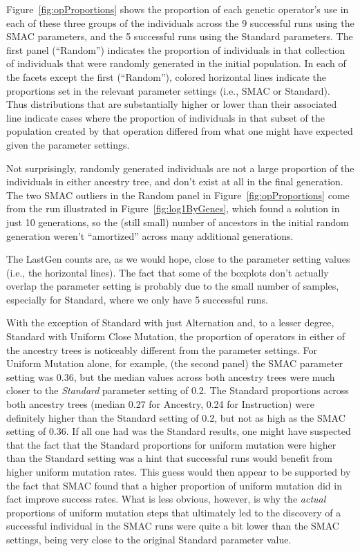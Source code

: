 Figure~\ref{fig:opProportions} shows the proportion of each genetic 
operator's use in each of these three groups of the individuals across
the 9 successful runs using the SMAC parameters, and the 5 successful runs
using the Standard parameters. The first
panel (``Random'') indicates the proportion of individuals in that collection
of individuals that were randomly generated in the initial population. 
In each of
the facets except the first (``Random''), colored horizontal lines indicate
the proportions set in the relevant parameter settings (i.e., SMAC or
Standard). Thus distributions that are substantially higher or lower than
their associated line indicate cases where the proportion of individuals in
that subset of the population created by that operation differed from what
one might have expected given the parameter settings.

Not surprisingly, randomly generated individuals are not a large
proportion of the individuals in either ancestry tree, and don't exist
at all in the final generation. The two SMAC outliers in the Random panel in Figure~\ref{fig:opProportions} come from the run
illustrated in Figure~\ref{fig:log1ByGenes}, which found a solution in 
just 10 generations, so the (still small) number
of ancestors in the initial random generation weren't ``amortized''
across many additional generations.

The LastGen counts are, as we would hope, close to the parameter
setting values (i.e., the horizontal lines). The fact that some of the
boxplots don't actually overlap the parameter setting is probably due
to the small number of samples, especially for Standard, where we only
have 5 successful runs.

With the exception of Standard with just Alternation and, to a
lesser degree, Standard with Uniform Close Mutation, the proportion
of operators in either of the ancestry trees is noticeably
different from the parameter settings. For Uniform Mutation alone, for 
example, (the second panel) the SMAC parameter setting
was 0.36, but the median values across both ancestry trees were much closer to
the \emph{Standard} parameter setting of 0.2. The Standard proportions across
both ancestry trees (median 0.27 for Ancestry, 0.24 for Instruction) were definitely higher than the Standard setting of 0.2, but not as high as the
SMAC setting of 0.36. If all one had was the Standard results, one might 
have suspected that the fact that
the Standard proportions for uniform mutation were higher than the Standard
setting was a hint that successful runs would benefit from higher uniform
mutation rates. This guess would then appear to be supported by the fact
that SMAC found that a higher proportion of uniform mutation did in fact
improve success rates. What is less obvious, however, is why the \emph{actual}
proportions of uniform mutation steps that ultimately led to the discovery of
a successful individual in the SMAC runs were quite a bit lower than the SMAC
settings, being very close to the original Standard parameter value.

